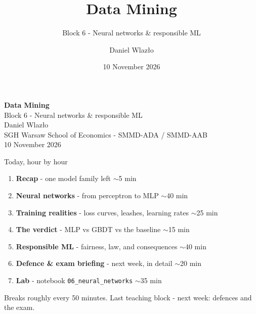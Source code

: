\documentclass[10pt,aspectratio=169]{beamer}
\title[Data Mining]{Data Mining}
\subtitle{Block 6 - Neural networks \& responsible ML}
\author{Daniel Wlazło}
\institute{SGH Warsaw School of Economics - SMMD-ADA / SMMD-AAB}
\date{10 November 2026}
\begin{document}
\begin{frame}[plain]
  \begin{center}
    \vspace{1cm}
    {\LARGE\textbf{Data Mining}}\\[0.5cm]
    {\large Block 6 - Neural networks \& responsible ML}\\[1.5cm]
    {\large Daniel Wlazło} \\[0.2cm]
    {\small SGH Warsaw School of Economics - SMMD-ADA / SMMD-AAB} \\[0.2cm]
    {\small 10 November 2026}
  \end{center}
\end{frame}

\begin{frame}{Today, hour by hour}
  \begin{enumerate}
    \item \textbf{Recap} - one model family left \hfill {\small$\sim$5 min}
    \item \textbf{Neural networks} - from perceptron to MLP \hfill {\small$\sim$40 min}
    \item \textbf{Training realities} - loss curves, leashes, learning rates \hfill {\small$\sim$25 min}
    \item \textbf{The verdict} - MLP vs GBDT vs the baseline \hfill {\small$\sim$15 min}
    \item \textbf{Responsible ML} - fairness, law, and consequences \hfill {\small$\sim$40 min}
    \item \textbf{Defence \& exam briefing} - next week, in detail \hfill {\small$\sim$20 min}
    \item \textbf{Lab} - notebook \texttt{06\_neural\_networks} \hfill {\small$\sim$35 min}
  \end{enumerate}
  \vspace{0.3em}
  \begin{center}\small Breaks roughly every 50 minutes. Last teaching block -
  next week: defences and the exam.\end{center}
\end{frame}
\end{document}
